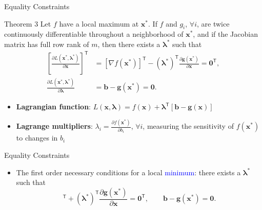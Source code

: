 \documentclass[aspectratio=169,hyperref,UTF8,CJK]{beamer}
\newcommand{\trans}{\mathsf{T}}
\newcommand{\vect}[1]{\boldsymbol{#1}}
\begin{document}
\begin{frame}{Equality Constraints}
  \scriptsize
  \begin{block}{Theorem 3}
    Let $f$ have a local maximum at $\vect{x}^{*}$. If $f$ and $g_i$, $\forall i$, are twice continuously differentiable throughout a neighborhood of $\vect{x}^{*}$, and if the Jacobian matrix has full row rank of $m$, then there exists a $\vect{\lambda}^{*}$ such that
    \begin{align*}
      \left[\frac{\partial L(\vect{x}^{*},\vect{\lambda}^{*})}{\partial\vect{x}}\right]^{\trans}
      &=[\nabla f(\vect{x}^{*})]^{\trans}-(\vect{\lambda}^{*})^{\trans}
      \frac{\partial\vect{g}(\vect{x}^{*})}{\partial\vect{x}}=\vect{0}^{\trans},\\
      \frac{\partial L(\vect{x}^{*},\vect{\lambda}^{*})}{\partial\vect{\lambda}}
      &=\vect{b}-\vect{g}(\vect{x}^{*})=\vect{0}.
    \end{align*}
  \end{block}
  \begin{itemize}
    \item \textbf{Lagrangian function}: $L(\vect{x},\vect{\lambda})=f(\vect{x})+\vect{\lambda}^{\trans}[\vect{b}-\vect{g}(\vect{x})]$
    \item \textbf{Lagrange multipliers}: $\lambda_i=\frac{\partial f(\vect{x}^{*})}{\partial b_i}$, $\forall i$, measuring the sensitivity of $f(\vect{x}^{*})$ to changes in $b_i$
  \end{itemize}
\end{frame}

\begin{frame}{Equality Constraints}
  \begin{itemize}
    \item The first order necessary conditions for a local \textcolor{blue}{minimum}: there exists a $\vect{\lambda}^{*}$ such that
      \begin{equation*}
        [\nabla f(\vect{x}^{*})]^{\trans}+(\vect{\lambda}^{*})^{\trans}
        \frac{\partial\vect{g}(\vect{x}^{*})}{\partial\vect{x}}=\vect{0}^{\trans},
        \qquad
        \vect{b}-\vect{g}(\vect{x}^{*})=\vect{0}.
      \end{equation*}
  \end{itemize}
\end{frame}
\end{document}
